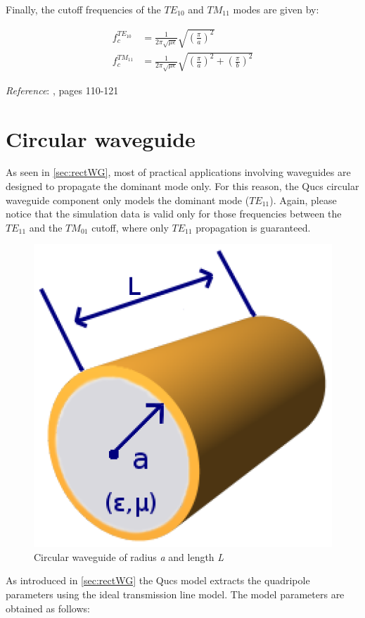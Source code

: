 \noindent Finally, the cutoff frequencies of the $TE_{10}$ and $TM_{11}$ modes are given by:

\begin{align}
f_c^{TE_{10}} & = \frac{1}{2 \pi \sqrt{\mu \epsilon}} \sqrt{\left( \frac{\pi}{a}\right)^2 } \\
f_c^{TM_{11}} &= \frac{1}{2 \pi \sqrt{\mu \epsilon}} \sqrt{\left( \frac{\pi}{a}\right)^2 +\left( \frac{\pi}{b}\right)^2 }
\end{align}


\noindent \textit{Reference}: \cite{Pozar}, pages 110-121

\section{Circular waveguide}

As seen in \ref{sec:rectWG}, most of practical applications involving waveguides are designed to propagate the dominant mode only. For this reason, the Qucs circular waveguide component only models the dominant mode ($TE_{11}$). Again, please notice that the simulation data is valid only for those frequencies between the $TE_{11}$ and the $TM_{01}$ cutoff, where only $TE_{11}$ propagation is guaranteed.

\begin{figure}[H]
\begin{center}
\includegraphics[width=0.5\linewidth]{circularwaveguide}
\end{center}
\caption{Circular waveguide of radius \textit{a} and length \textit{L}}
\label{fig:circwg}
\end{figure}

\noindent As introduced in \ref{sec:rectWG} the Qucs model extracts the quadripole parameters using the ideal transmission line model. The model parameters are obtained as follows:\\

